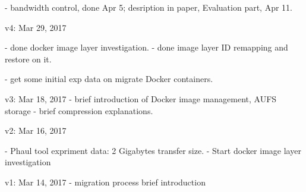  - bandwidth control, done Apr 5; desription in paper, Evaluation part, Apr 11.

v4: Mar 29, 2017
    
    - done docker image layer investigation.
    - done image layer ID remapping and restore on it.
    
    - get some initial exp data on migrate Docker containers.
    

v3: Mar 18, 2017
    - brief introduction of Docker image management, AUFS storage
    - brief compression explanations.
    
v2: Mar 16, 2017

    - Phaul tool expriment data: 2 Gigabytes transfer size. 
    - Start docker image layer investigation

v1: Mar 14, 2017
    - migration process brief introduction


\fi


